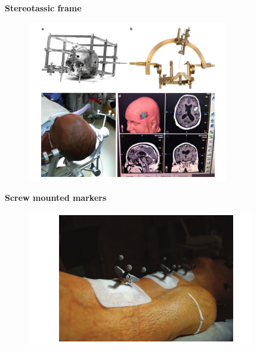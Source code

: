 \textbf{Stereotassic frame}
\begin{figure}[H]
    \centering
    \includegraphics[width=\linewidth, keepaspectratio]{capitoli/immagini/imgs/strssotic-frame.png}
\end{figure}

\textbf{Screw mounted markers}
\begin{figure}[H]
    \centering
    \includegraphics[width=\linewidth, keepaspectratio]{capitoli/immagini/imgs/screw-mounted-markes.png}
\end{figure}


